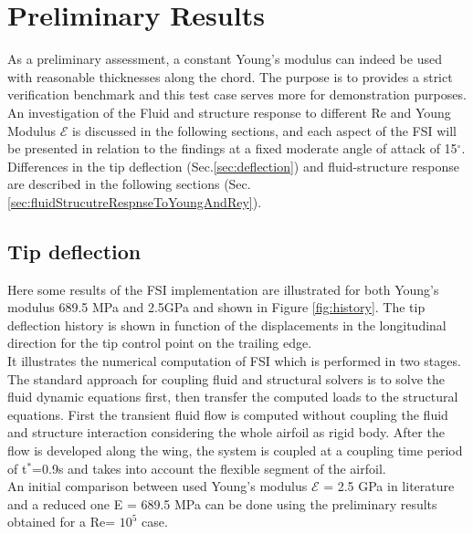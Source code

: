 
\section{\label{sec:preliminary}Preliminary Results}
As a preliminary assessment, a constant Young’s modulus can indeed be used with reasonable thicknesses along the chord. The purpose is to provides a strict veriﬁcation benchmark and this test case serves more for demonstration purposes.
An investigation of the Fluid and structure response to different Re and Young Modulus $\mathcal{E}$ is discussed in the following sections, and each aspect of the FSI will be presented in relation to the findings  at a ﬁxed moderate angle of attack of 15$^{\circ}$.
Differences in the tip deflection (Sec.\ref{sec:deflection}) and fluid-structure response are described in the following sections (Sec.\ref{sec:fluidStrucutreRespnseToYoungAndRey}).



\subsection{\label{sec:deflection} Tip deflection}

Here some results of the FSI implementation are illustrated for both Young's modulus 689.5 MPa and 2.5GPa and shown in Figure \ref{fig:history}. The tip deflection history is shown in function of the displacements in the longitudinal direction for the tip control point on the trailing edge.\\

It illustrates the numerical computation of FSI which is performed in two stages.
The standard approach for coupling fluid and structural solvers is to solve the fluid dynamic equations first, then transfer the computed loads to the structural equations.
First the transient fluid flow is computed without coupling the fluid and structure interaction considering the whole airfoil as rigid body. After the flow is developed along the wing, the system is coupled at a coupling time period of t$^*$=0.9s and takes into account the flexible segment of the airfoil.\\
An initial comparison between used Young's modulus $\mathcal{E}$ = 2.5 GPa in literature and  a reduced one E = 689.5 MPa can be done using the preliminary results obtained for a Re= $10^5$ case. \\

